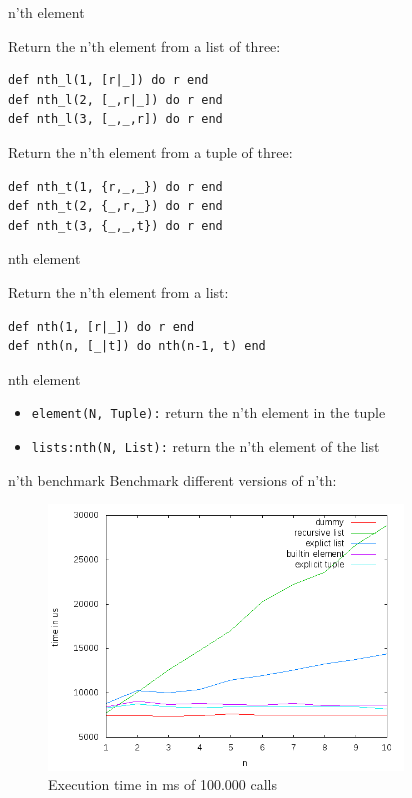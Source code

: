 \begin{frame}[fragile]{n'th element}

Return the n'th element from a list of three:

\pause 
\begin{verbatim}
def nth_l(1, [r|_]) do r end
def nth_l(2, [_,r|_]) do r end
def nth_l(3, [_,_,r]) do r end
\end{verbatim}

\pause Return the n'th element from a tuple of three:
\pause

\begin{verbatim}
def nth_t(1, {r,_,_}) do r end
def nth_t(2, {_,r,_}) do r end
def nth_t(3, {_,_,t}) do r end
\end{verbatim}

\end{frame}

\begin{frame}[fragile]{nth element}

Return the n'th element from a list:

\pause 
\begin{verbatim}
def nth(1, [r|_]) do r end
def nth(n, [_|t]) do nth(n-1, t) end
\end{verbatim}

\end{frame}


\begin{frame}{nth element}

\begin{itemize}
  \item {\tt element(N, Tuple):} return the n'th element in the tuple
  \item {\tt lists:nth(N, List):} return the n'th element of the list
\end{itemize}

\end{frame}

\begin{frame}{n'th benchmark}
Benchmark different versions of n'th:
 \begin{figure}
  \centering
  \includegraphics[height=200pt]{nth.png}
  \caption{Execution time in ms of 100.000 calls}
 \end{figure}

\end{frame}

